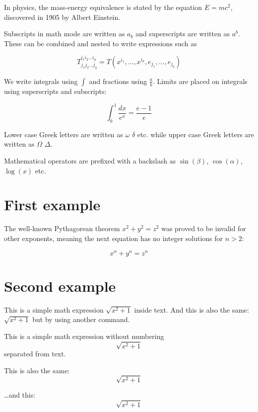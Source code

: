 \documentclass[12pt, letterpaper]{book}
\begin{document}
	In physics, the mass-energy equivalence is stated 
	by the equation $E=mc^2$, discovered in 1905 by Albert Einstein.
	
	Subscripts in math mode are written as $a_b$ and superscripts are written as $a^b$. These can be combined and nested to write expressions such as
	
	\[ T^{i_1 i_2 \dots i_p}_{j_1 j_2 \dots j_q} = T(x^{i_1},\dots,x^{i_p},e_{j_1},\dots,e_{j_q}) \]
	
	We write integrals using $\int$ and fractions using $\frac{a}{b}$. Limits are placed on integrals using superscripts and subscripts:
	
	\[ \int_0^1 \frac{dx}{e^x} =  \frac{e-1}{e} \]
	
	Lower case Greek letters are written as $\omega$ $\delta$ etc. while upper case Greek letters are written as $\Omega$ $\Delta$.
	
	Mathematical operators are prefixed with a backslash as $\sin(\beta)$, $\cos(\alpha)$, $\log(x)$ etc.
	
	\section{First example}
	
	The well-known Pythagorean theorem \(x^2 + y^2 = z^2\) was proved to be invalid for other exponents, meaning the next equation has no integer solutions for \(n>2\):
	
	\[ x^n + y^n = z^n \]
	
	\section{Second example}
	
	This is a simple math expression \(\sqrt{x^2+1}\) inside text. 
	And this is also the same: 
	\begin{math}
		\sqrt{x^2+1}
	\end{math}
	but by using another command.
	
	This is a simple math expression without numbering
	\[\sqrt{x^2+1}\] 
	separated from text.
	
	This is also the same:
	\begin{displaymath}
		\sqrt{x^2+1}
	\end{displaymath}
	
	\ldots and this:
	\begin{equation*}
		\sqrt{x^2+1}
	\end{equation*}
	
\end{document}
